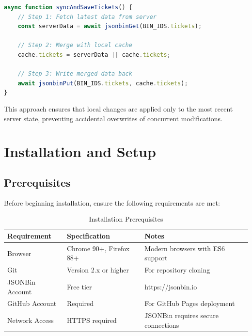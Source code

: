 \documentclass[12pt,a4paper]{report}
\begin{document}
\begin{lstlisting}[language=JavaScript, caption={Sync-Before-Write Pattern}, label={lst:sync-pattern}]
async function syncAndSaveTickets() {
    // Step 1: Fetch latest data from server
    const serverData = await jsonbinGet(BIN_IDS.tickets);
    
    // Step 2: Merge with local cache
    cache.tickets = serverData || cache.tickets;
    
    // Step 3: Write merged data back
    await jsonbinPut(BIN_IDS.tickets, cache.tickets);
}
\end{lstlisting}

This approach ensures that local changes are applied only to the most recent server state, preventing accidental overwrites of concurrent modifications.

\cleardoublepage

\chapter{Installation and Setup}
\thispagestyle{fancy}
\label{chap:installation}

\section{Prerequisites}
\label{sec:prerequisites}

Before beginning installation, ensure the following requirements are met:

\begin{table}[H]
    \centering
    \caption[Installation Prerequisites]{Installation Prerequisites}
    \begin{tabular}{|l|l|p{6cm}|}
        \hline
        \textbf{Requirement} & \textbf{Specification} & \textbf{Notes} \\
        \hline
        Browser & Chrome 90+, Firefox 88+ & Modern browsers with ES6 support \\
        \hline
        Git & Version 2.x or higher & For repository cloning \\
        \hline
        JSONBin Account & Free tier & https://jsonbin.io \\
        \hline
        GitHub Account & Required & For GitHub Pages deployment \\
        \hline
        Network Access & HTTPS required & JSONBin requires secure connections \\
        \hline
    \end{tabular}
    \label{tab:prerequisites}
\end{table}
\end{document}
